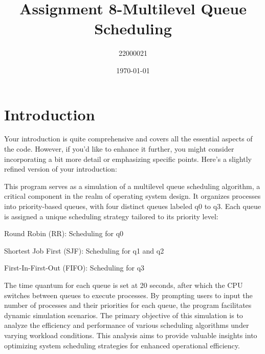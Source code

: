 \documentclass{article}
\title{\Huge Assignment 8-Multilevel Queue Scheduling}
\author{22000021}
\date{\today}
\begin{document}
\maketitle
\newpage

\tableofcontents
\newpage

\section{Introduction}

Your introduction is quite comprehensive and covers all the essential aspects of the code. However, if you'd like to enhance it further, you might consider incorporating a bit more detail or emphasizing specific points. Here's a slightly refined version of your introduction:

This program serves as a simulation of a multilevel queue scheduling algorithm, a critical component in the realm of operating system design. It organizes processes into priority-based queues, with four distinct queues labeled q0 to q3. Each queue is assigned a unique scheduling strategy tailored to its priority level: 
\begin{center}
  \begin{description}
      \item Round Robin (RR): Scheduling for q0
      \item Shortest Job First (SJF): Scheduling for q1 and q2
      \item First-In-First-Out (FIFO): Scheduling for q3
  \end{description}
\end{center}  
The time quantum for each queue is set at 20 seconds, after which the CPU switches between queues to execute processes. By prompting users to input the number of processes and their priorities for each queue, the program facilitates dynamic simulation scenarios. The primary objective of this simulation is to analyze the efficiency and performance of various scheduling algorithms under varying workload conditions. This analysis aims to provide valuable insights into optimizing system scheduling strategies for enhanced operational efficiency.
\end{document}

